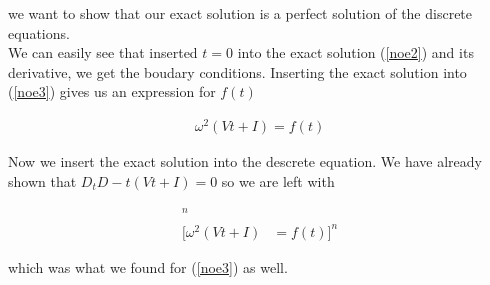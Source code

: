 \documentclass[12pt, a4paper]{article}
\begin{document}
{we want to show that our exact solution is a perfect solution of the discrete equations. \\

We can easily see that inserted \(t = 0\) into the exact solution (\ref{noe2}) and its derivative, we get the boudary conditions. Inserting the exact solution into (\ref{noe3}) gives us an expression for \(f(t)\)

\begin{align*}
	\omega^2 (Vt + I) = f(t)
\end{align*}

Now we insert the exact solution into the descrete equation. We have already shown that \(D_t D-t (Vt + I) = 0\) so we are left with 

\begin{align*}
	[\omega^2u_e(x,t) &= f(t)]^n \\
	[\omega^2(Vt + I) &= f(t)]^n
\end{align*}

which was what we found for (\ref{noe3}) as well. 
}
\end{document}
